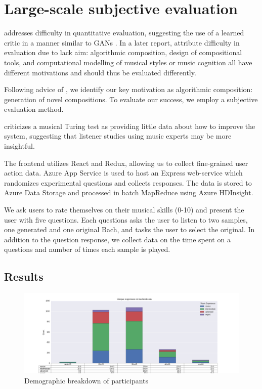 \documentclass[dissertation.tex]{subfiles}
\begin{document}
\chapter{Large-scale subjective evaluation}

\cite{pearce2001towards} addresses difficulty in quantitative evaluation,
suggesting the use of a learned critic in a manner similar to GANs
\cite{goodfellow2014generative}. In a later report,
\cite{pearce2002motivations} attribute difficulty in evaluation due to lack
aim: algorithmic composition, design of compositional tools, and computational
modelling of musical styles or music cognition all have different motivations
and should thus be evaluated differently.

Following advice of \cite{pearce2002motivations}, we identify our key
motivation as algorithmic composition: generation of novel compositions.
To evaluate our success, we employ a subjective evaluation method.

\cite{ariza2009} criticizes a musical Turing test as providing little data about
how to improve the system, suggesting that listener studies using music experts
may be more insightful.



The frontend utilizes React and Redux, allowing us to collect fine-grained user
action data. Azure App Service is used to host an Express web-service which
randomizes experimental questions and collects responses. The data is stored to
Azure Data Storage and processed in batch MapReduce using Azure HDInsight.

We ask users to rate themselves on their musical skills (0-10) and present the
user with five questions. Each questions asks the user to listen to two
samples, one generated and one original Bach, and tasks the user to select the
original. In addition to the question response, we collect data on the time
spent on a questions and number of times each sample is played.

\section{Results}

\begin{figure}[htpb]
  \centering
  \includegraphics[width=1.0\linewidth]{Figures/responses-ageGroup-musicExperience.png}
  \caption{Demographic breakdown of participants}
  \label{fig:responses-ageGroup-musicExperience}
\end{figure}
\end{document}
